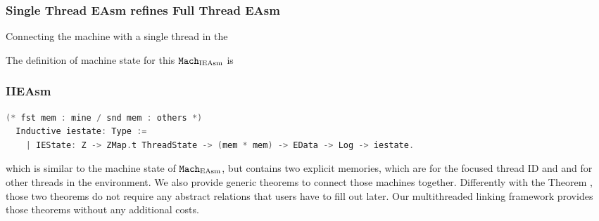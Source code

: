 \subsubsection{Single Thread EAsm refines Full Thread EAsm}

Connecting the machine with a single thread in
the 

The definition of machine state for this ${\mathrm{\texttt{Mach}}}_{\mathrm{IEAsm}}$ is 
\subsubsection{IIEAsm}
\begin{lstlisting}[language=C]
  (* fst mem : mine / snd mem : others *)
  Inductive iestate: Type :=
    | IEState: Z -> ZMap.t ThreadState -> (mem * mem) -> EData -> Log -> iestate.
\end{lstlisting}
which is similar to the machine state of ${\mathrm{\texttt{Mach}}}_{\mathrm{EAsm}}$, but 
contains two explicit memories, which are for the focused thread ID and 
and for other threads in the environment.
We also provide generic theorems 
to connect those machines together. 
Differently with the 
Theorem ,
those two theorems
do not require any abstract relations that
users have to fill out later. 
Our multithreaded linking framework 
provides those theorems without any additional costs. 



\begin{lemma}

\end{lemma}


\begin{lemma}

\end{lemma}


%

